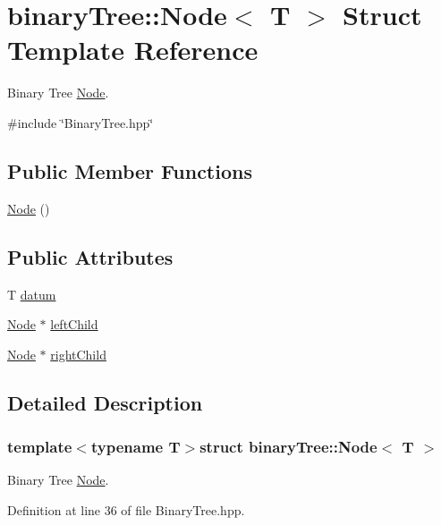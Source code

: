 \hypertarget{structbinaryTree_1_1Node}{\section{binary\-Tree\-:\-:Node$<$ T $>$ Struct Template Reference}
\label{structbinaryTree_1_1Node}
}


Binary Tree \hyperlink{structbinaryTree_1_1Node}{Node}.  




{\ttfamily \#include \char`\"{}Binary\-Tree.\-hpp\char`\"{}}

\subsection*{Public Member Functions}
\begin{DoxyCompactItemize}
\item 
\hyperlink{structbinaryTree_1_1Node_af8ec0ca3c43fa4a857031cec46569ee2}{Node} ()
\end{DoxyCompactItemize}
\subsection*{Public Attributes}
\begin{DoxyCompactItemize}
\item 
T \hyperlink{structbinaryTree_1_1Node_afaa501220b0051287ddf2bb7a38ac09b}{datum}
\item 
\hyperlink{structbinaryTree_1_1Node}{Node} $\ast$ \hyperlink{structbinaryTree_1_1Node_a1892fef92312a1f93ec0e99901145f78}{left\-Child}
\item 
\hyperlink{structbinaryTree_1_1Node}{Node} $\ast$ \hyperlink{structbinaryTree_1_1Node_ad80da15e3643639a0e9ff964c9d83ae9}{right\-Child}
\end{DoxyCompactItemize}


\subsection{Detailed Description}
\subsubsection*{template$<$typename T$>$struct binary\-Tree\-::\-Node$<$ T $>$}

Binary Tree \hyperlink{structbinaryTree_1_1Node}{Node}. 

Definition at line 36 of file Binary\-Tree.\-hpp.



